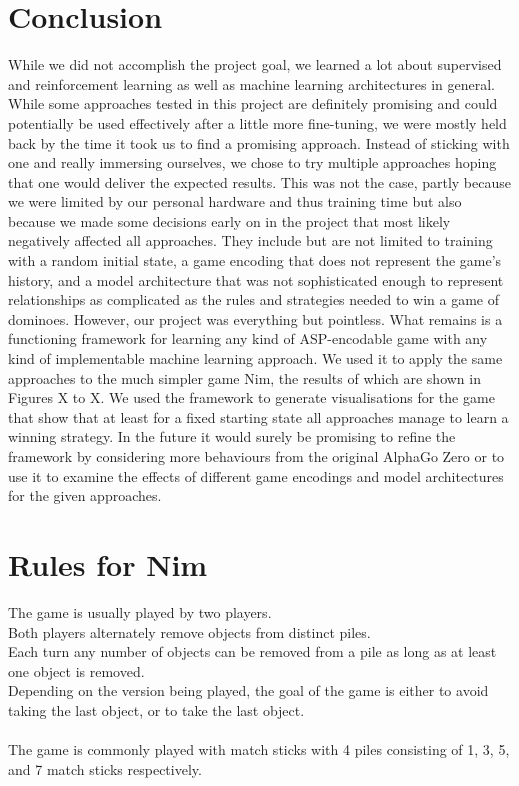 \documentclass[12pt,a4paper]{article}
\begin{document}
\section{Conclusion}
While we did not accomplish the project goal, we learned a lot about supervised and reinforcement learning as well as machine learning architectures in general. While some approaches tested in this project are definitely promising and could potentially be used effectively after a little more fine-tuning, we were mostly held back by the time it took us to find a promising approach. Instead of sticking with one and really immersing ourselves, we chose to try multiple approaches hoping that one would deliver the expected results. This was not the case, partly because we were limited by our personal hardware and thus training time but also because we made some decisions early on in the project that most likely negatively affected all approaches. They include but are not limited to training with a random initial state, a game encoding that does not represent the game’s history, and a model architecture that was not sophisticated enough to represent relationships as complicated as the rules and strategies needed to win a game of dominoes.
However, our project was everything but pointless. What remains is a functioning framework for learning any kind of ASP-encodable game with any kind of implementable machine learning approach. We used it to apply the same approaches to the much simpler game Nim, the results of which are shown in Figures X to X. We used the framework to generate visualisations for the game that show that at least for a fixed starting state all approaches manage to learn a winning strategy. In the future it would surely be promising to refine the framework by considering more behaviours from the original AlphaGo Zero or to use it to examine the effects of different game encodings and model architectures for the given approaches.





\appendix
\section{Rules for Nim}
\label{a:nimrules}
The game is usually played by two players.  \\
Both players alternately remove objects from distinct piles. \\
Each turn any number of objects can be removed from a pile as long as at least one object is removed. \\
Depending on the version being played, the goal of the game is either to avoid taking the last object, or to take the last object. \\ 
\\
The game is commonly played with match sticks with 4 piles consisting of 1, 3, 5, and 7 match sticks respectively.
\end{document}
